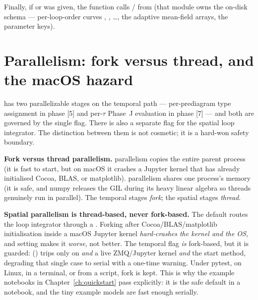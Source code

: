 Finally, if  or  was given, the function calls
 /  from  (that module owns
the on-disk schema --- per-loop-order curves , ,
\dots, the adaptive mean-field arrays, the parameter keys).

\section{Parallelism: fork versus thread, and the macOS hazard}\label{sec:co-parallel}

\Daedalus{} has two parallelizable stages on the temporal path --- per-prediagram
type assignment in phase [5] and per-$\tau$ Phase~J evaluation in phase [7] ---
and both are governed by the single  flag. There is also a
separate  flag for the spatial loop integrator. The
distinction between them is not cosmetic; it is a hard-won safety boundary.

\begin{defn}
\textbf{Fork versus thread parallelism.}
 parallelism copies the entire parent process (it is fast to start,
but on macOS it crashes a Jupyter kernel that has already initialised Cocoa, BLAS,
or matplotlib).  parallelism shares one process's memory (it is safe,
and numpy releases the GIL during its heavy linear algebra so threads genuinely
run in parallel). The temporal stages \emph{fork}; the spatial stages
\emph{thread}.
\end{defn}

\begin{gotcha}
\textbf{Spatial parallelism is thread-based, never fork-based.} The default
 routes the loop integrator through a
. Forking after Cocoa/BLAS/matplotlib initialisation
inside a macOS Jupyter kernel \emph{hard-crashes the kernel and the OS}, and
setting  makes it \emph{worse},
not better. The temporal  flag \emph{is} fork-based, but it is
guarded:  () trips
only on  \emph{and} a live ZMQ/Jupyter kernel \emph{and} the
 start method, degrading that single case to serial with a one-time
warning. Under pytest, on Linux, in a terminal, or from a script, fork is kept.
This is why the example notebooks in Chapter~\ref{ch:quickstart} pass
 explicitly: it is the safe default in a notebook, and the
tiny example models are fast enough serially.
\end{gotcha}

